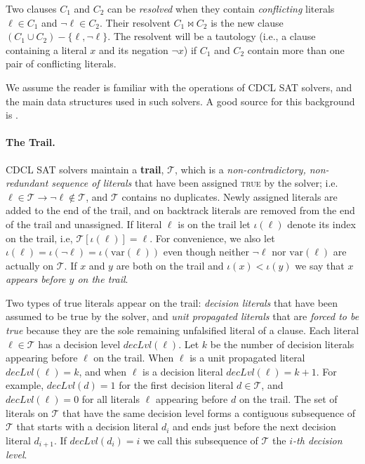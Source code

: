 \documentclass[runningheads]{llncs}
\newcommand{\sat}{SAT\xspace}
\newcommand{\trail}{\ensuremath{\mathcal{T}}}
\newcommand{\trailIdx}[1]{\ensuremath{\iota(#1)}}
\newcommand{\dlevel}[1]{\ensuremath{\mathit{decLvl}(#1)}}
\newcommand{\var}{\text{var}}
\newcommand{\true}{\textsc{true}\xspace}
\newcommand{\resolve}{\bowtie}
\renewcommand{\implies}{\rightarrow}
\begin{document}
Two clauses $C_1$ and $C_2$ can be \emph{resolved} when they contain
\emph{conflicting} literals $\ell\in C_1$ and $\lnot \ell \in
C_2$. Their resolvent $C_1 \resolve C_2$ is the new clause
$(C_1 \cup C_2) - \{\ell, \lnot \ell\}$. The resolvent will be a
tautology (i.e., a clause containing a literal $x$ and its negation
$\lnot x$) if $C_1$ and $C_2$ contain more than one pair of
conflicting literals.

We assume the reader is familiar with the operations of CDCL \sat
solvers, and the main data structures used in such solvers. A good
source for this background is \cite{DBLP:series/faia/SilvaLM09}.

\paragraph{The Trail.}
CDCL \sat solvers maintain a \textbf{trail}, $\trail$, which is a
\textit{non-contradictory, non-redundant sequence of literals} that
have been assigned \true by the solver; i.e.
$\ell\in\trail \implies \lnot\ell \not\in\trail$, and $\trail$
contains no duplicates. Newly assigned literals are added to the end
of the trail, and on backtrack literals are removed from the end of
the trail and unassigned.  If literal $\ell$ is on the trail let
$\trailIdx{\ell}$ denote its index on the trail, i.e,
$\trail[\trailIdx{\ell}] = \ell$. For convenience, we also let
$\trailIdx{\ell} = \trailIdx{\lnot \ell} = \trailIdx{\var(\ell)}$ even
though neither $\lnot \ell$ nor $\var(\ell)$ are actually on
$\trail$. If $x$ and $y$ are both on the trail and
$\trailIdx{x} < \trailIdx{y}$ we say that \textit{$x$ appears before
  $y$ on the trail}. 

Two types of true literals appear on the trail: \emph{decision
  literals} that have been assumed to be true by the solver, and
\emph{unit propagated literals} that are \emph{forced to be true}
because they are the sole remaining unfalsified literal of a
clause. Each literal $\ell\in\trail$ has a decision level
$\dlevel{\ell}$. Let $k$ be the number of decision literals appearing
before $\ell$ on the trail. When $\ell$ is a unit propagated literal
$\dlevel{\ell}=k$, and when $\ell$ is a decision literal
$\dlevel{\ell}=k+1$. For example, $\dlevel{d}=1$ for the first
decision literal $d\in\trail$, and $\dlevel{\ell}=0$ for all literals
$\ell$ appearing before $d$ on the trail.  The set of literals on
$\trail$ that have the same decision level forms a contiguous
subsequence of $\trail$ that starts with a decision literal $d_i$ and
ends just before the next decision literal $d_{i+1}$. If
$\dlevel{d_i} = i$ we call this subsequence of $\trail$ the
\textit{$i$-th decision level}.
\end{document}
